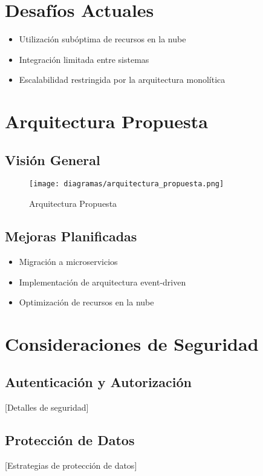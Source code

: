 \documentclass[12pt,a4paper]{article}
\begin{document}
\section{Desafíos Actuales}
\begin{itemize}
    \item Utilización subóptima de recursos en la nube
    \item Integración limitada entre sistemas
    \item Escalabilidad restringida por la arquitectura monolítica
\end{itemize}

\section{Arquitectura Propuesta}
\subsection{Visión General}
\begin{figure}[H]
    \centering
    \texttt{[image: diagramas/arquitectura\_propuesta.png]}
    \caption{Arquitectura Propuesta}
    \label{fig:arq-propuesta}
\end{figure}

\subsection{Mejoras Planificadas}
\begin{itemize}
    \item Migración a microservicios
    \item Implementación de arquitectura event-driven
    \item Optimización de recursos en la nube
\end{itemize}

\section{Consideraciones de Seguridad}
\subsection{Autenticación y Autorización}
[Detalles de seguridad]

\subsection{Protección de Datos}
[Estrategias de protección de datos]
\end{document}
